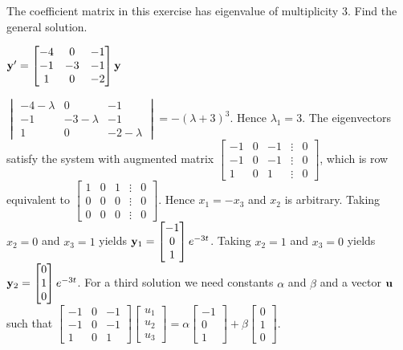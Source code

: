 \documentclass{ximera}
\begin{document}
 \begin{problem}\label{exer:10.5.30}  
 The coefficient matrix in this exercise
has eigenvalue of multiplicity $3$. Find the
general solution.

$ {\bf y}'
= \begin{bmatrix}-4&0&-1\\-1&-3&-1\\1&0&-2\end{bmatrix}{\bf y}$

\begin{solution}
    $ \begin{vmatrix}-4-\lambda&0&-1\\-1&-3-\lambda&-1\\1&0&-2-\lambda\end{vmatrix}
=-(\lambda+3)^3$.
Hence $\lambda_1=3$.
The eigenvectors
 satisfy the system with  augmented matrix
$  \begin{bmatrix}-1&0&-1&\vdots&0\\-1&0&-1&
\vdots&0\\1&0&1&\vdots&0 \end{bmatrix}$,
which is row equivalent to
$  \begin{bmatrix}1&0&1&\vdots&0\\0&0&0&
\vdots&0\\0&0&0&\vdots&0 \end{bmatrix}$.
Hence  $x_1=-x_3$ and $x_2$ is arbitrary.  Taking $x_2=0$ and $x_3=1$
yields
${\bf y}_1= \begin{bmatrix}-1\\0\\1 \end{bmatrix}e^{-3t}$.
Taking $x_2=1$ and $x_3=0$
yields  ${\bf y}_2= \begin{bmatrix}0\\1\\0 \end{bmatrix}e^{-3t}$.
For a third solution we need constants $\alpha$ and $\beta$  and a
vector ${\bf u}$ such that
$  \begin{bmatrix}-1&0&-1\\-1&0&-1\\1&0&1 \end{bmatrix} \begin{bmatrix}u_1\\u_2\\u_3 \end{bmatrix}
=\alpha  \begin{bmatrix}-1\\0\\1 \end{bmatrix}+\beta \begin{bmatrix}0\\1\\0 \end{bmatrix}$.

\end{solution}
\end{problem}
\end{document}
